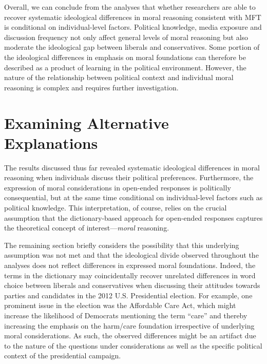 \documentclass[12pt]{article}
\begin{document}
Overall, we can conclude from the analyses that whether researchers are able to recover systematic ideological differences in moral reasoning consistent with MFT is conditional on individual-level factors. Political knowledge, media exposure and discussion frequency not only affect general levels of moral reasoning but also moderate the ideological gap between liberals and conservatives. Some portion of the ideological differences in emphasis on moral foundations can therefore be described as a product of learning in the political environment. However, the nature of the relationship between political context and individual moral reasoning is complex and requires further investigation.


\section*{Examining Alternative Explanations}

The results discussed thus far revealed systematic ideological differences in moral reasoning when individuals discuss their political preferences. Furthermore, the expression of moral considerations in open-ended responses is politically consequential, but at the same time conditional on individual-level factors such as political knowledge. This interpretation, of course, relies on the crucial assumption that the dictionary-based approach for open-ended responses captures the theoretical concept of interest---\textit{moral} reasoning.

The remaining section briefly considers the possibility that this underlying assumption was not met and that the ideological divide observed throughout the analyses does not reflect differences in expressed moral foundations. Indeed, the terms in the dictionary may coincidentally recover unrelated differences in word choice between liberals and conservatives when discussing their attitudes towards parties and candidates in the 2012 U.S. Presidential election. For example, one prominent issue in the election was the Affordable Care Act, which might increase the likelihood of Democrats mentioning the term ``care'' and thereby increasing the emphasis on the harm/care foundation irrespective of underlying moral considerations. As such, the observed differences might be an artifact due to the nature of the questions under considerations as well as the specific political context of the presidential campaign.
\end{document}
